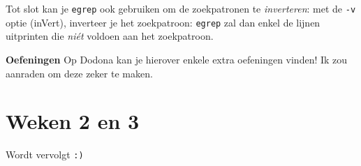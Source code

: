 \documentclass[a4paper,twoside,openany]{memoir}
\begin{document}
Tot slot kan je \verb!egrep! ook gebruiken om de zoekpatronen te \emph{inverteren}: met de \verb!-v! optie (inVert), inverteer je het zoekpatroon: \verb!egrep! zal dan enkel de lijnen uitprinten die \emph{ni\'et} voldoen aan het zoekpatroon.

\textbf{Oefeningen} Op Dodona kan je hierover enkele extra oefeningen vinden! Ik zou aanraden om deze zeker te maken.

\part{Weken 2 en 3}
Wordt vervolgt \verb!:)!
\end{document}
